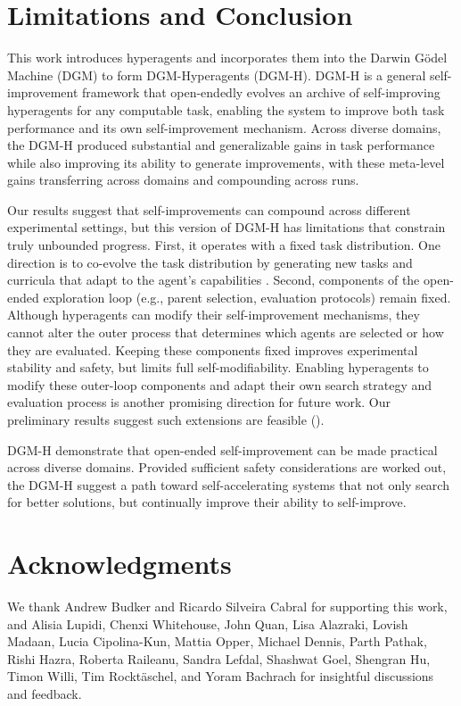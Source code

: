 \documentclass[]{fairmeta}
\begin{document}
\section{Limitations and Conclusion}
\label{sec:conclusion}

This work introduces hyperagents and incorporates them into the Darwin G\"odel Machine (DGM) to form DGM-Hyperagents (DGM-H). DGM-H is a general self-improvement framework that open-endedly evolves an archive of self-improving hyperagents for any computable task, enabling the system to improve both task performance and its own self-improvement mechanism. Across diverse domains, the DGM-H produced substantial and generalizable gains in task performance while also improving its ability to generate improvements, with these meta-level gains transferring across domains and compounding across runs.

Our results suggest that self-improvements can compound across different experimental settings, but this version of DGM-H has limitations that constrain truly unbounded progress.
First, it operates with a fixed task distribution. One direction is to co-evolve the task distribution by generating new tasks and curricula that adapt to the agent's capabilities \citep{clune2019ai, zhangomni, faldoromni, bolton2025sima}.
Second, components of the open-ended exploration loop (e.g., parent selection, evaluation protocols) remain fixed. Although hyperagents can modify their self-improvement mechanisms, they cannot alter the outer process that determines which agents are selected or how they are evaluated. Keeping these components fixed improves experimental stability and safety, but limits full self-modifiability. Enabling hyperagents to modify these outer-loop components and adapt their own search strategy and evaluation process is another promising direction for future work. Our preliminary results suggest such extensions are feasible ().

DGM-H demonstrate that open-ended self-improvement can be made practical across diverse domains. Provided sufficient safety considerations are worked out, the DGM-H suggest a path toward self-accelerating systems that not only search for better solutions, but continually improve their ability to self-improve.

\section*{Acknowledgments}
We thank Andrew Budker and Ricardo Silveira Cabral for supporting this work, and Alisia Lupidi, Chenxi Whitehouse, John Quan, Lisa Alazraki, Lovish Madaan, Lucia Cipolina-Kun, Mattia Opper, Michael Dennis, Parth Pathak, Rishi Hazra, Roberta Raileanu, Sandra Lefdal, Shashwat Goel, Shengran Hu, Timon Willi, Tim Rockt\"aschel, and Yoram Bachrach for insightful discussions and feedback.
\end{document}
